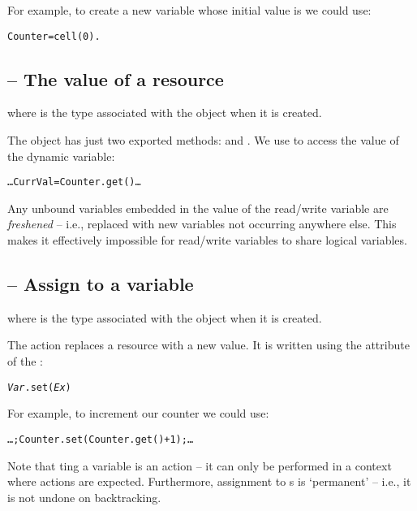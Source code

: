 For example, to create a new  variable whose initial value is  we could use:
\begin{alltt}
Counter = cell(0).
\end{alltt}

\subsection{ -- The value of a  resource}
\label{dynamic:getvar}

where  is the type associated with the  object when it is created.

The  object has just two exported methods:  and . We use  to access the value of the dynamic variable:
\begin{alltt}
\ldots CurrVal = Counter.get() \ldots
\end{alltt}
Any unbound variables embedded in the value of the read/write variable are \emph{freshened} -- i.e., replaced with new variables not occurring anywhere else. This makes it effectively impossible for read/write variables to share logical variables.

\subsection{ -- Assign to a  variable}
\label{dynamic:assignment}

where  is the type associated with the  object when it is created.

The  action replaces a  resource with a new value. It is written using the  attribute of the :
\begin{alltt}
\emph{Var}.set(\emph{Ex})
\end{alltt}
For example, to increment our counter we could use:
\begin{alltt}
\ldots;Counter.set(Counter.get()+1);\ldots
\end{alltt}
Note that ting a  variable is an action -- it can only be performed in a context where actions are expected.
Furthermore, assignment to s is `permanent' -- i.e., it is not undone on backtracking.

